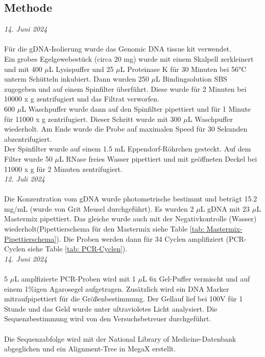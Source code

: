 \documentclass[oneside,10pt,a4paper]{report}
\begin{document}
			\subsection{Methode}
				\textit{14. Juni 2024}\\
				\\
				Für die gDNA-Isolierung wurde das Genomic DNA tissue kit verwendet.\\
				Ein grobes Egelgewebestück (circa 20 mg) wurde mit einem Skalpell zerkleinert und mit 400 $\mu$L Lysispuffer und 25 $\mu$L Proteinase K für 30 Minuten bei 56°C unterm Schütteln inkubiert. Dann wurden 250 $\mu$L Bindingsolution SBS zugegeben und auf einem Spinfilter überführt. Diese wurde für 2 Minuten bei 10000 x g zentrifugiert und das Filtrat verworfen.\\
				600 $\mu$L Waschpuffer wurde dann auf den Spinfilter pipettiert und für 1 Minute für 11000 x g zentrifugiert. Dieser Schritt wurde mit 300 $\mu$L Waschpuffer wiederholt. Am Ende wurde die Probe auf maximalen Speed für 30 Sekunden abzentrifugiert.\\
				Der Spinfilter wurde auf einem 1.5 mL Eppendorf-Röhrchen gesteckt. Auf dem Filter wurde 50 $\mu$L RNase freies Wasser pipettiert und mit geöffneten Deckel bei 11000 x g für 2 Minuten zentrifugiert.
				\\
				\textit{12. Juli 2024}\\
				\\
				Die Konzentration vom gDNA wurde photometrische bestimmt und beträgt 15.2 mg/mL (wurde von Grit Meusel durchgeführt).
				Es wurden 2 $\mu$L gDNA mit 23 $\mu$L Mastermix pipettiert. Das gleiche wurde auch mit der Negativkontrolle (Wasser) wiederholt(Pipettierschema für den Mastermix siehe Table \ref{tab: Mastermix-Pipettierschema}).
				Die Proben werden dann für 34 Cyclen amplifiziert (PCR-Cyclen siehe Table \ref{tab: PCR-Cyclen}).
				\\
				\textit{14. Juni 2024}\\
				\\
				5 $\mu$L amplfizierte PCR-Proben wird mit 1 $\mu$L 6x Gel-Puffer vermischt und auf einem 1$\%$igen Agarosegel aufgetragen. Zusätzlich wird ein DNA Marker mitraufpipettiert für die Größenbestimmung.
				Der Gellauf lief bei 100V für 1 Stunde und das Geld wurde unter ultravioletes Licht analysiert. Die Sequenzbestimmung wird von den Versuchsbetreuer durchgeführt.\\
				\\
				Die Sequenzabfolge wird mit der National Library of Medicine-Datenbank abgeglichen und ein Alignment-Tree in MegaX erstellt.
				
\end{document}
